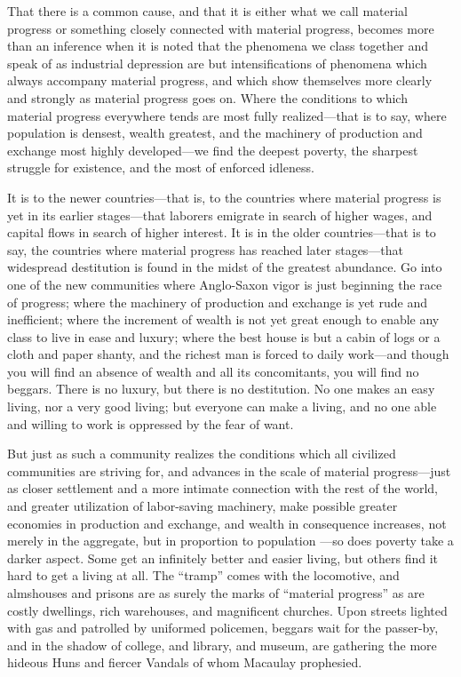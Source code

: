 That there is a common cause, and that it is either what we call
material progress or something closely connected with material progress,
becomes more than an inference when it is noted that the phenomena we
class together and speak of as industrial depression are but
intensifications of phenomena which always accompany material progress,
and which show themselves more clearly and strongly as material progress
goes on. Where the conditions to which material progress everywhere
tends are most fully realized---that is to say, where population is
densest, wealth greatest, and the machinery of production and exchange
most highly developed---we find the deepest poverty, the sharpest
struggle for existence, and the most of enforced idleness.

It is to the newer countries---that is, to the countries where material
progress is yet in its earlier stages---that laborers emigrate in search
of higher wages, and capital flows in search of higher interest. It is
in the older countries---that is to say, the countries where material
progress has reached later stages---that widespread destitution is found
in the midst of the greatest abundance. Go into one of the new
communities where Anglo-Saxon vigor is just beginning the race of
progress; where the machinery of production and exchange is yet rude and
inefficient; where the increment of wealth is not yet great enough to
enable any class to live in ease and luxury; where the best house is but
a cabin of logs or a cloth and paper shanty, and the richest man is
forced to daily work---and though you will find an absence of wealth and
all its concomitants, you will find no beggars. There is no luxury, but
there is no destitution. No one makes an easy living, nor a very good
living; but everyone can make a living, and no one able and willing to
work is oppressed by the fear of want.

But just as such a community realizes the conditions which all civilized
communities are striving for, and advances in the scale of material
progress---just as closer settlement and a more intimate connection with
the rest of the world, and greater utilization of labor-saving
machinery, make possible greater economies in production and exchange,
and wealth in consequence increases, not merely in the aggregate, but in
proportion to population ---so does poverty take a darker aspect. Some
get an infinitely better and easier living, but others find it hard to
get a living at all. The ``tramp'' comes with the locomotive, and
almshouses and prisons are as surely the marks of ``material progress''
as are costly dwellings, rich warehouses, and magnificent churches. Upon
streets lighted with gas and patrolled by uniformed policemen, beggars
wait for the passer-by, and in the shadow of college, and library, and
museum, are gathering the more hideous Huns and fiercer Vandals of whom
Macaulay prophesied.

